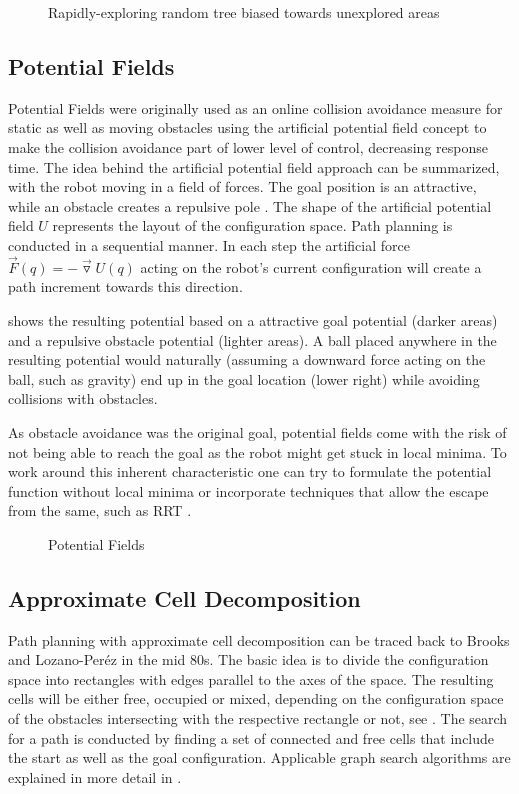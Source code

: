 \begin{figure}[h]
    \caption{Rapidly-exploring random tree biased towards unexplored areas}
    \label{fig:RRT}
\end{figure}

\subsection{Potential Fields}
Potential Fields were originally used as an online collision avoidance measure for static as well as moving obstacles using the artificial potential field concept to make the collision avoidance part of lower level of control, decreasing response time. The idea behind the artificial potential field approach can be summarized, with the robot moving in a field of forces. The goal position is an attractive, while an obstacle creates a repulsive pole \cite{Khatib.1986}. The shape of the artificial potential field $U$ represents the layout of the configuration space. Path planning is conducted in a sequential manner. In each step the artificial force $\vec{F}(q) = -\vec{\triangledown}U(q)$ acting on the robot's current configuration will create a path increment towards this direction. \cite{Latombe.1991}

 shows the resulting potential based on a attractive goal potential (darker areas) and a repulsive obstacle potential (lighter areas). A ball placed anywhere in the resulting potential would naturally (assuming a downward force acting on the ball, such as gravity) end up in the goal location (lower right) while avoiding collisions with obstacles.

As obstacle avoidance was the original goal, potential fields come with the risk of not being able to reach the goal as the robot might get stuck in local minima. To work around this inherent characteristic one can try to formulate the potential function without local minima or incorporate techniques that allow the escape from the same, such as RRT \cite{LaValle.2006}. \cite{Latombe.1991}

\begin{figure}[h]
    \caption{Potential Fields}
    \label{fig:potentialFields}
\end{figure}

\subsection{Approximate Cell Decomposition}
Path planning with approximate cell decomposition can be traced back to Brooks and Lozano-Peréz in the mid 80s. The basic idea is to divide the configuration space into rectangles with edges parallel to the axes of the space. The resulting cells will be either free, occupied or mixed, depending on the configuration space of the obstacles intersecting with the respective rectangle or not, see . The search for a path is conducted by finding a set of connected and free cells that include the start as well as the goal configuration.\cite{Brooks.1985} Applicable graph search algorithms are explained in more detail in .

